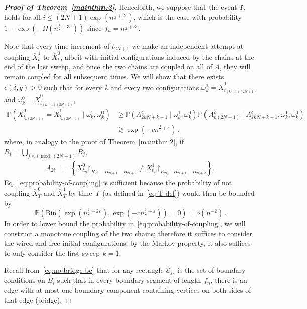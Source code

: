 \documentclass[reqno,11pt]{amsart}
\numberwithin{equation}{section}
\renewcommand{\restriction}{\mathord{\upharpoonright}}
\renewcommand{\epsilon}{\varepsilon}
\theoremstyle{definition}{
\newtheorem{example}[theorem]{Example}
\newtheorem{definition}[theorem]{Definition}
\newtheorem*{definition*}{Definition}
\newtheorem{problem}[theorem]{Problem}
\newtheorem{question}[theorem]{Question}
\newtheorem{remark}[theorem]{Remark}
}
\renewcommand{\epsilon}{\varepsilon}
\begin{document}
\begin{proof}[\textbf{\emph{Proof of Theorem~\ref{mainthm:3}}}]
Henceforth, we suppose that the event $\Upsilon_i$ holds for all $i\leq (2N+1) \exp ({n^{\frac 12 +2\epsilon}})$, which is  the case with probability $1-\exp(-\Omega(n^{\frac 12 +3\epsilon}))$ since $f_n =n^{\frac 12 +3\epsilon}$. 

Note that every time increment of $t_{2N+1}$ we make an independent attempt at coupling $\bar X_t^1$ to $\bar X_t^0$, albeit with initial configurations induced by the chains at the end of the last sweep, and once the two chains are coupled on all of $\Lambda$, they will remain coupled for all subsequent times. We will show that there exists $c(\delta,q)>0$ such that for every $k$ and every two configurations $\omega^1_k = \bar X_{t_{(k-1)(2N+1)}}^1$ and $\omega^0_k = \bar X_{t_{(k-1)(2N+1)}}^0$,
\begin{align}\label{eq:probability-of-coupling}
\mathbb P(\bar X^0_{t_{k(2N+1)}}=  \bar X^1_{t_{k(2N+1)}}\mid \omega^1_k,\omega^0_k)& \geq \mathbb P(A_{2kN+k-1}^c\mid \omega^1_k,\omega^0_k) \mathbb P(A_{k(2N+1)}^c\mid A_{2kN+k-1}^c,\omega^1_k,\omega^0_k) \nonumber\\
& \gtrsim \exp(-cn^{\frac 12+\epsilon})\,,
\end{align}
where, in analogy to the proof of Theorem~\ref{mainthm:2}, if $R_i = \bigcup_{j\leq i \bmod (2N+1)} B_j$, 
\begin{align*}
A_{2i}& = \left\{X_{t_{2i}}^0 \restriction_{R_{2i}-B_{2i+1}-B_{2i+2}}\neq X_{t_{2i}}^1\restriction_{R_{2i}-B_{2i+1}-B_{2i+2}}\right\}\,.
\end{align*}
Eq.~\eqref{eq:probability-of-coupling} is sufficient because the probability of not coupling $\bar X_T^0$ and $\bar X_T^1$ by time~$T$ (as defined in~\eqref{eq-T-def})  would then be bounded by \[\mathbb P\left(\mbox{Bin}(\exp(n^{\frac 12+2\epsilon}), \exp(-cn^{\frac 12+\epsilon}))=0\right)=o(n^{-2})\,.\]
In order to lower bound the probability in~\eqref{eq:probability-of-coupling}, we will construct a monotone coupling of the two chains; therefore it suffices to consider the wired and free initial configurations; by the Markov property, it also suffices to only consider the first sweep $k=1$.

Recall from~\eqref{eq:no-bridge-bc} that for any rectangle $\mathcal E_{f_n}$ is the set of boundary conditions on $B_i$ such that in every boundary segment of length $f_n$, there is an edge with at most one boundary component containing vertices on both sides of that edge (bridge). 


\end{proof}
\end{document}
